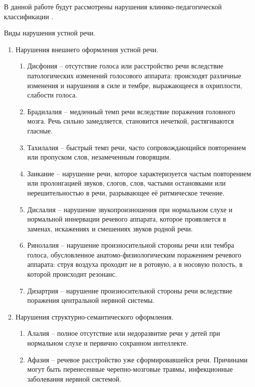 В данной работе будут рассмотрены нарушения клинико-педагогической классификации \cite{defrechi}. 

Виды нарушения устной речи.
\begin{enumerate}
	\item Нарушения внешнего оформления устной речи.
	\begin{enumerate}
		\item Дисфония -- отсутствие голоса или расстройство речи вследствие патологических изменений голосового аппарата: происходят различные изменения и нарушения в силе и тембре, выражающееся в охриплости, слабости голоса.
		\item Брадилалия -- медленный темп речи вследствие поражения головного мозга. Речь сильно замедляется, становится нечеткой, растягиваются гласные.
		\item Тахилалия -- быстрый темп речи, часто сопровождающийся повторением или пропуском слов, незамеченным говорящим. 
		\item Заикание -- нарушение речи, которое характеризуется частым повторением или пролонгацией звуков, слогов, слов, частыми остановками или нерешительностью в речи, разрывающее её ритмическое течение.
		\item Дислалия -- нарушение звукопроизношения при нормальном слухе и нормальной иннервации речевого аппарата, которое проявляется в заменах, искажениях и смешениях звуков родной речи.
		\item Ринолалия -- нарушение произносительной стороны речи или тембра голоса, обусловленное анатомо-физиологическим поражением речевого аппарата: струя воздуха проходит не в ротовую, а в носовую полость, в которой происходит резонанс.
		\item Дизартрия -- нарушение произносительной стороны речи вследствие поражения центральной нервной системы. 
	\end{enumerate}
	\item Нарушения структурно-семантического оформления.
	\begin{enumerate}
		\item Алалия -- полное отсутствие или недоразвитие речи у детей при нормальном слухе и первично сохранном интеллекте.
		\item Афазия -- речевое расстройство уже сформировавшейся речи. Причинами могут быть перенесенные черепно-мозговые травмы, инфекционные заболевания нервной системой.
	\end{enumerate}
\end{enumerate}

